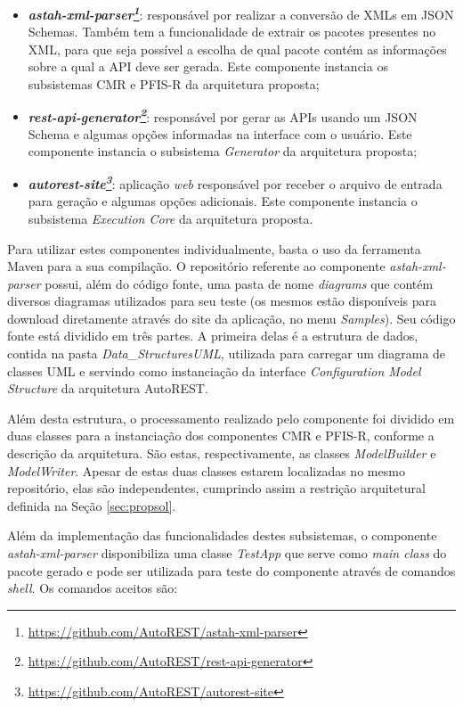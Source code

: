 \begin{itemize}
    \item \textit{\textbf{astah-xml-parser\footnote{\url{https://github.com/AutoREST/astah-xml-parser}}}}: responsável por realizar a conversão de XMLs em JSON Schemas. Também tem a funcionalidade de extrair os pacotes presentes no XML, para que seja possível a escolha de qual pacote contém as informações sobre a qual a API deve ser gerada. Este componente instancia os subsistemas CMR e PFIS-R da arquitetura proposta;
    \item \textit{\textbf{rest-api-generator\footnote{\url{https://github.com/AutoREST/rest-api-generator}}}}: responsável por gerar as APIs usando um JSON Schema e algumas opções informadas na interface com o usuário. Este componente instancia o subsistema \textit{Generator} da arquitetura proposta;
    \item \textit{\textbf{autorest-site\footnote{\url{https://github.com/AutoREST/autorest-site}}}}: aplicação \textit{web} responsável por receber o arquivo de entrada para geração e algumas opções adicionais. Este componente instancia o subsistema \textit{Execution Core} da arquitetura proposta.
\end{itemize}

Para utilizar estes componentes individualmente, basta o uso da ferramenta Maven para a sua compilação. O repositório referente ao componente \textit{astah-xml-parser} possui, além do código fonte, uma pasta de nome \textit{diagrams} que contém diversos diagramas utilizados para seu teste (os mesmos estão disponíveis para download diretamente através do site da aplicação, no menu \textit{Samples}). Seu código fonte está dividido em três partes. A primeira delas é a estrutura de dados, contida na pasta \textit{Data\_Structures\/UML}, utilizada para carregar um diagrama de classes UML e servindo como instanciação da interface \textit{Configuration Model Structure} da arquitetura AutoREST.

Além desta estrutura, o processamento realizado pelo componente foi dividido em duas classes para a instanciação dos componentes CMR e PFIS-R, conforme a descrição da arquitetura. São estas, respectivamente, as classes \textit{ModelBuilder} e \textit{ModelWriter}. Apesar de estas duas classes estarem localizadas no mesmo repositório, elas são independentes, cumprindo assim a restrição arquitetural definida na Seção \ref{sec:propsol}.

Além da implementação das funcionalidades destes subsistemas, o componente \textit{astah-xml-parser} disponibiliza uma classe \textit{TestApp} que serve como \textit{main class} do pacote gerado e pode ser utilizada para teste do componente através de comandos \textit{shell}. Os comandos aceitos são:

